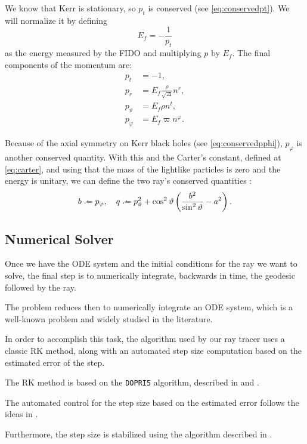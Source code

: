 We know that Kerr is stationary, so $p_t$ is conserved (see \autoref{eq:conservedpt}). We will normalize it by defining
\[
E_f = - \frac{1}{p_t}
\]  
as the energy measured by the \ac{FIDO} and multiplying $p$ by $E_f$. The final components of the momentum \cite[Eq. (A.11)]{thorne15} are:
\begin{align}
p_t &= -1, \\
p_r &= E_f \frac{\rho}{\sqrt{\Delta}} n^r, \\
p_\vartheta &= E_f \rho n^t, \\
p_\varphi &= E_f \varpi n^\varphi.
\end{align}

Because of the axial symmetry on Kerr black holes (see \autoref{eq:conservedpphi}), $p_\varphi$ is another conserved quantity. With this and the Carter's constant, defined at \autoref{eq:carter}, and using that the mass of the lightlike particles is zero and the energy is unitary, we can define the two ray's conserved quantities \cite[Eq. (A.12)]{thorne15}:
\begin{equation}
b \defeq p_\varphi, \quad q \defeq p_\vartheta^2 + \cos^2\vartheta \left( \frac{b^2}{\sin^2\vartheta} - a^2 \right).
\end{equation}

\subsection{Numerical Solver}
\label{sec:numerical}

Once we have the \ac{ODE} system and the initial conditions for the ray we want to solve, the final step is to numerically integrate, backwards in time, the geodesic followed by the ray.

The problem reduces then to numerically integrate an \ac{ODE} system, which is a well-known problem and widely studied in the literature.

In order to accomplish this task, the algorithm used by our ray tracer uses a classic \ac{RK} method, along with an automated step size computation based on the estimated error of the step.

The \ac{RK} method is based on the \texttt{DOPRI5} algorithm, described in \cite{hairer93} and \cite{hairer96}.

The automated control for the step size based on the estimated error follows the ideas in \cite[Sec. II.4, Subsec. Automatic Step Size Control]{hairer93}.

Furthermore, the step size is stabilized using the algorithm described in \cite[Sec. IV.2]{hairer96}.

